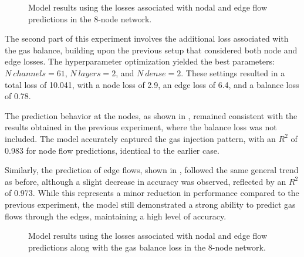 \begin{figure}[h] 
    \centering
    \setlength{}        
    \setlength{} 
    
    \caption{Model results using the losses associated with nodal and edge flow predictions in the 8-node network.}
    \label{fig:dummy_base_results}
\end{figure}


The second part of this experiment involves the additional loss associated with the gas balance, building upon the previous setup that considered both node and edge losses. The hyperparameter optimization yielded the best parameters: $N \ channels =61$, $N \ layers =2$, and $N \ dense=2$. These settings resulted in a total loss of 10.041, with a node loss of 2.9, an edge loss of 6.4, and a balance loss of 0.78.

The prediction behavior at the nodes, as shown in , remained consistent with the results obtained in the previous experiment, where the balance loss was not included. The model accurately captured the gas injection pattern, with an $R^2$ of 0.983 for node flow predictions, identical to the earlier case.

Similarly, the prediction of edge flows, shown in , followed the same general trend as before, although a slight decrease in accuracy was observed, reflected by an $R^2$ of 0.973. While this represents a minor reduction in performance compared to the previous experiment, the model still demonstrated a strong ability to predict gas flows through the edges, maintaining a high level of accuracy.

\begin{figure}[h]
    \centering
    \setlength{}        
    \setlength{} 
    \caption{Model results using the losses associated with nodal and edge flow predictions along with the gas balance loss in the 8-node network.}
    \label{fig:dummy_base_results}
\end{figure}


